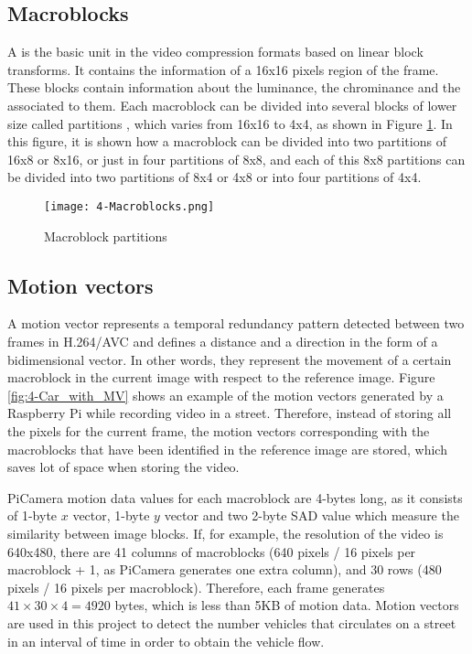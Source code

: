 \subsection{Macroblocks}
\label{subsect:Macroblocks}
A  is the basic unit in the video compression formats based on linear block transforms. It contains the information of a 16x16 pixels region of the frame. These blocks contain information about the luminance, the chrominance and the  associated to them. Each macroblock can be divided into several blocks of lower size called partitions \cite{Gir14}, which varies from 16x16 to 4x4, as shown in Figure \ref{fig:4-Macroblocks}. In this figure, it is shown how a macroblock can be divided into two partitions of 16x8 or 8x16, or just in four partitions of 8x8, and each of this 8x8 partitions can be divided into two partitions of 8x4 or 4x8 or into four partitions of 4x4.

\begin{figure}[!h]
	\begin{center}
		\texttt{[image: 4-Macroblocks.png]}
		\caption{Macroblock partitions}
		\label{fig:4-Macroblocks}
	\end{center}
\end{figure}


\subsection{Motion vectors}
A motion vector represents a temporal redundancy pattern detected between two frames in H.264/AVC and defines a distance and a direction in the form of a bidimensional vector. In other words, they represent the movement of a certain macroblock in the current image with respect to the reference image. Figure \ref{fig:4-Car_with_MV} shows an example of the motion vectors generated by a Raspberry Pi while recording video in a street. Therefore, instead of storing all the pixels for the current frame, the motion vectors corresponding with the macroblocks that have been identified in the reference image are stored, which saves lot of space when storing the video.

PiCamera motion data values for each macroblock are 4-bytes long, as it consists of 1-byte $x$ vector, 1-byte $y$ vector and two 2-byte \ac{SAD} value which measure the similarity between image blocks.  If, for example, the resolution of the video is 640x480, there are 41 columns of macroblocks (640 pixels / 16 pixels per macroblock + 1, as PiCamera generates one extra column), and 30 rows (480 pixels / 16 pixels per macroblock). Therefore, each frame generates $41\times30\times4 = 4920$ bytes, which is less than 5KB of motion data. Motion vectors are used in this project to detect the number vehicles that circulates on a street in an interval of time in order to obtain the vehicle flow.

